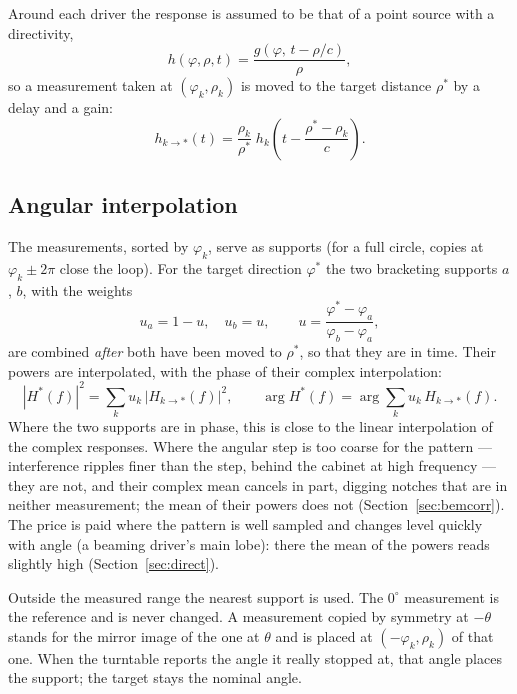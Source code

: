 \documentclass[11pt,a4paper]{article}
\begin{document}
Around each driver the response is assumed to be that of a point source with a directivity,
\begin{equation}
  h(\varphi,\rho,t)=\frac{g(\varphi,\,t-\rho/c)}{\rho},
\end{equation}
so a measurement taken at $(\varphi_k,\rho_k)$ is moved to the target distance $\rho^*$ by a delay
and a gain:
\begin{equation}
  h_{k\to*}(t)=\frac{\rho_k}{\rho^*}\;h_k\!\left(t-\frac{\rho^*-\rho_k}{c}\right).
\end{equation}

\subsection{Angular interpolation}

The measurements, sorted by $\varphi_k$, serve as supports (for a full circle, copies at
$\varphi_k\pm2\pi$ close the loop). For the target direction $\varphi^*$ the two bracketing supports
$a$, $b$, with the weights
\begin{equation}
  u_a=1-u,\quad u_b=u,\qquad u=\frac{\varphi^*-\varphi_a}{\varphi_b-\varphi_a},
\end{equation}
are combined \emph{after} both have been moved to $\rho^*$, so that they are in time. Their powers are
interpolated, with the phase of their complex interpolation:
\begin{equation}
  |H^*(f)|^2=\sum_k u_k\,|H_{k\to*}(f)|^2,\qquad \arg H^*(f)=\arg\sum_k u_k\,H_{k\to*}(f).
  \label{eq:powers}
\end{equation}
Where the two supports are in phase, this is close to the linear interpolation of the complex responses.
Where the angular step is too coarse for the pattern --- interference ripples finer than the step, behind
the cabinet at high frequency --- they are not, and their complex mean cancels in part, digging notches
that are in neither measurement; the mean of their powers does not (Section~\ref{sec:bemcorr}). The price
is paid where the pattern is well sampled and changes level quickly with angle (a beaming driver's main
lobe): there the mean of the powers reads slightly high (Section~\ref{sec:direct}).

Outside the measured range the nearest support is used. The $0^\circ$ measurement is the reference and
is never changed. A measurement copied by symmetry at $-\theta$ stands for the mirror image of the one
at $\theta$ and is placed at $(-\varphi_k,\rho_k)$ of that one. When the turntable reports the angle it
really stopped at, that angle places the support; the target stays the nominal angle.
\end{document}
